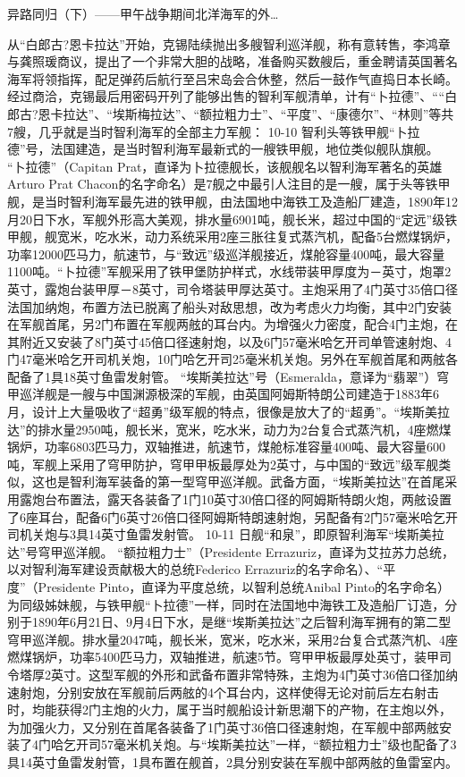 \documentclass[12pt,UTF8]{ctexbook}
\begin{document}
异路同归（下）——甲午战争期间北洋海军的外…

从“白郎古?恩卡拉达”开始，克锡陆续抛出多艘智利巡洋舰，称有意转售，李鸿章与龚照瑗商议，提出了一个非常大胆的战略，准备购买数艘后，重金聘请英国著名海军将领指挥，配足弹药后航行至吕宋岛会合休整，然后一鼓作气直捣日本长崎。 经过商洽，克锡最后用密码开列了能够出售的智利军舰清单，计有“卜拉德”、““白郎古?恩卡拉达”、“埃斯梅拉达”、“额拉粗力士”、“平度”、“康德尔”、“林则”等共7艘，几乎就是当时智利海军的全部主力军舰：
10-10
智利头等铁甲舰“卜拉德”号，法国建造，是当时智利海军最新式的一艘铁甲舰，地位类似舰队旗舰。
“卜拉德”（Capitan Prat，直译为卜拉德舰长，该舰舰名以智利海军著名的英雄Arturo Prat Chacon的名字命名）是7舰之中最引人注目的是一艘，属于头等铁甲舰，是当时智利海军最先进的铁甲舰，由法国地中海铁工及造船厂建造，1890年12月20日下水，军舰外形高大美观，排水量6901吨，舰长米，超过中国的“定远”级铁甲舰，舰宽米，吃水米，动力系统采用2座三胀往复式蒸汽机，配备5台燃煤锅炉，功率12000匹马力，航速节，与“致远”级巡洋舰接近，煤舱容量400吨，最大容量1100吨。“卜拉德”军舰采用了铁甲堡防护样式，水线带装甲厚度为－英寸，炮罩2英寸，露炮台装甲厚－8英寸，司令塔装甲厚达英寸。主炮采用了4门英寸35倍口径法国加纳炮，布置方法已脱离了船头对敌思想，改为考虑火力均衡，其中2门安装在军舰首尾，另2门布置在军舰两舷的耳台内。为增强火力密度，配合4门主炮，在其附近又安装了8门英寸45倍口径速射炮，以及6门57毫米哈乞开司单管速射炮、4门47毫米哈乞开司机关炮，10门哈乞开司25毫米机关炮。另外在军舰首尾和两舷各配备了1具18英寸鱼雷发射管。
“埃斯美拉达”号（Esmeralda，意译为“翡翠”）穹甲巡洋舰是一艘与中国渊源极深的军舰，由英国阿姆斯特朗公司建造于1883年6月，设计上大量吸收了“超勇”级军舰的特点，很像是放大了的“超勇”。“埃斯美拉达”的排水量2950吨，舰长米，宽米，吃水米，动力为2台复合式蒸汽机，4座燃煤锅炉，功率6803匹马力，双轴推进，航速节，煤舱标准容量400吨、最大容量600吨，军舰上采用了穹甲防护，穹甲甲板最厚处为2英寸，与中国的“致远”级军舰类似，这也是智利海军装备的第一型穹甲巡洋舰。武备方面，“埃斯美拉达”在首尾采用露炮台布置法，露天各装备了1门10英寸30倍口径的阿姆斯特朗火炮，两舷设置了6座耳台，配备6门6英寸26倍口径阿姆斯特朗速射炮，另配备有2门57毫米哈乞开司机关炮与3具14英寸鱼雷发射管。
10-11
日舰“和泉”，即原智利海军“埃斯美拉达”号穹甲巡洋舰。
“额拉粗力士”（Presidente Errazuriz，直译为艾拉苏力总统，以对智利海军建设贡献极大的总统Federico Errazuriz的名字命名）、“平度”（Presidente Pinto，直译为平度总统，以智利总统Anibal Pinto的名字命名）为同级姊妹舰，与铁甲舰“卜拉德”一样，同时在法国地中海铁工及造船厂订造，分别于1890年6月21日、9月4日下水，是继“埃斯美拉达”之后智利海军拥有的第二型穹甲巡洋舰。排水量2047吨，舰长米，宽米，吃水米，采用2台复合式蒸汽机、4座燃煤锅炉，功率5400匹马力，双轴推进，航速5节。穹甲甲板最厚处英寸，装甲司令塔厚2英寸。这型军舰的外形和武备布置非常特殊，主炮为4门英寸36倍口径加纳速射炮，分别安放在军舰前后两舷的4个耳台内，这样使得无论对前后左右射击时，均能获得2门主炮的火力，属于当时舰船设计新思潮下的产物，在主炮以外，为加强火力，又分别在首尾各装备了1门英寸36倍口径速射炮，在军舰中部两舷安装了4门哈乞开司57毫米机关炮。与“埃斯美拉达”一样，“额拉粗力士”级也配备了3具14英寸鱼雷发射管，1具布置在舰首，2具分别安装在军舰中部两舷的鱼雷室内。
\end{document}
